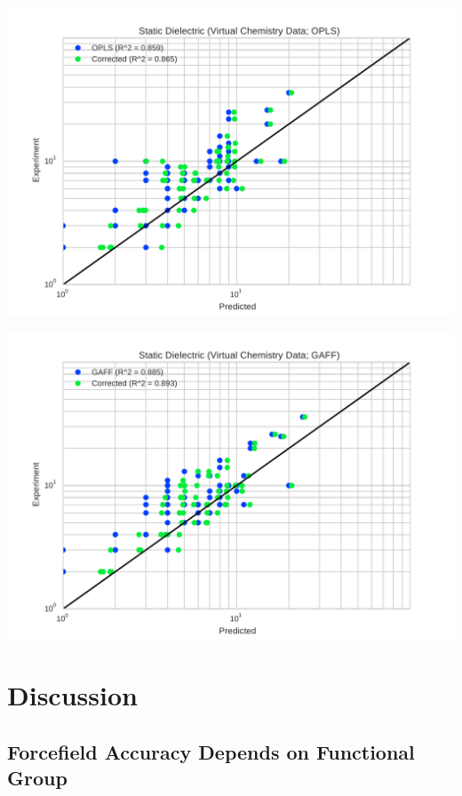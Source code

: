 \documentclass[aps,pre,twocolumn,superscriptaddress]{revtex4-1}
\begin{document}
\includegraphics[width=\columnwidth]{./figures/dielectric_virtual_chemistry_opls.pdf}

\includegraphics[width=\columnwidth]{./figures/dielectric_virtual_chemistry_gaff.pdf}

\section{Discussion}

\subsection{Forcefield Accuracy Depends on Functional Group}
\end{document}
